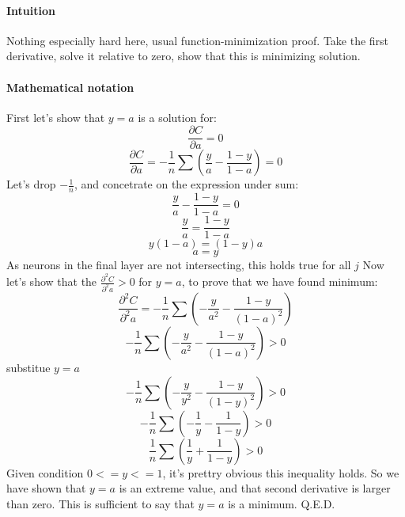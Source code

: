 \documentclass{article}
\begin{document}
\paragraph{Intuition}
Nothing especially hard here, usual function-minimization proof. 
Take the first derivative, solve it relative to zero, show that this is minimizing solution.
\paragraph{Mathematical notation}
First let's show that $y = a$ is a solution for:
 $$\frac{\partial C}{\partial a} = 0$$
 $$\frac{\partial C}{\partial a} = -\frac{1}{n}\sum(\frac{y}{a} - \frac{1-y}{1-a}) = 0$$
Let's drop $-\frac{1}{n}$, and concetrate on the expression under sum:
 $$\frac{y}{a} - \frac{1-y}{1-a} = 0$$
 $$\frac{y}{a} = \frac{1-y}{1-a}$$
 $$y(1-a) = (1-y)a$$
$$a = y$$
As neurons in the final layer are not intersecting, this holds true for all $j$
Now let's show that the $\frac{\partial^2 C}{\partial^2 a} > 0$ for $y = a$, to prove that we have found minimum:
$$\frac{\partial^2 C}{\partial^2 a} = -\frac{1}{n}\sum(-\frac{y}{a^2} - \frac{1-y}{(1-a)^2})$$
$$-\frac{1}{n}\sum(-\frac{y}{a^2} - \frac{1-y}{(1-a)^2}) > 0$$
substitue $y = a$
$$-\frac{1}{n}\sum(-\frac{y}{y^2} - \frac{1-y}{(1-y)^2}) > 0$$
$$-\frac{1}{n}\sum(-\frac{1}{y} - \frac{1}{1-y}) > 0$$
$$\frac{1}{n}\sum(\frac{1}{y} + \frac{1}{1-y}) > 0$$
Given condition $ 0 <= y <= 1$, it's prettry obvious this inequality holds.
So we have shown that $y = a$ is an extreme value, and that second derivative is larger than zero.
This is sufficient to say that $y = a$ is a minimum. 
Q.E.D.
\end{document}
